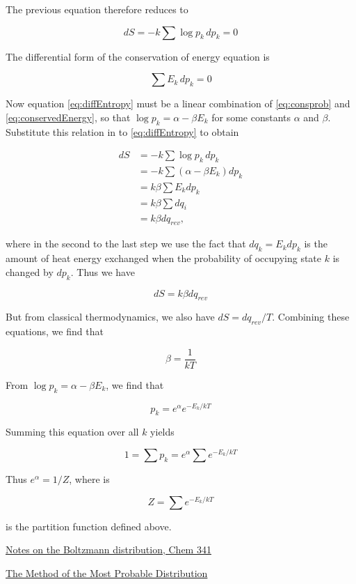 The previous equation therefore reduces to

\begin{equation}
\label{eq:diffEntropy}
 dS = -k \sum \log p_k\,  dp_k = 0
\end{equation}



The differential form of the conservation of energy equation is

\begin{equation}
\label{eq:dffConservedEnergy}
 \sum E_k\, d p_k = 0
\end{equation}

Now  equation \eqref{eq:diffEntropy} must be a linear combination of \eqref{eq:consprob}
and \eqref{eq:conservedEnergy}, so that $\log p_k = \alpha - \beta E_k$
for some constants $\alpha$ and $\beta$.  Substitute this relation in to \eqref{eq:diffEntropy} to obtain

\begin{align}
 dS & = -k \sum \log p_k\,  dp_k \\
      & = -k \sum (\alpha - \beta E_k) dp_k \\
      & = k\beta \sum E_k dp_k \\
     & = k\beta \sum dq_i \\
    & = k\beta dq_{rev},
\end{align}

where in the second to the last step we use the fact that $dq_k = E_k dp_k$  is the  amount of heat energy exchanged when the
probability of occupying state $k$ is changed by $dp_k$.  Thus we have

$$
dS = k\beta dq_{rev}
$$


But from classical thermodynamics, we also have $dS = dq_{rev}/T$.  Combining these equations, we find that

\begin{equation}
\beta = \frac{1}{kT}
\end{equation}

From $\log p_k = \alpha - \beta E_k$, we find that

\begin{equation}
p_k = e^\alpha e^{-E_k/kT}
\end{equation}

Summing this equation over all $k$ yields

\begin{equation}
1 = \sum p_k = e^\alpha \sum e^{-E_k/kT}
\end{equation}

Thus $e^\alpha = 1/Z$, where is

\begin{equation}
Z = \sum e^{-E_k/kT}
\end{equation}

is the partition function defined above.



\href{http://casegroup.rutgers.edu/lnotes/ccb341/boltzmann.pdf}{Notes on the Boltzmann distribution, Chem 341}

\href{http://www.physics.udel.edu/~glyde/PHYS813/Lectures/chapter_3.pdf}{The Method of the Most Probable Distribution}
